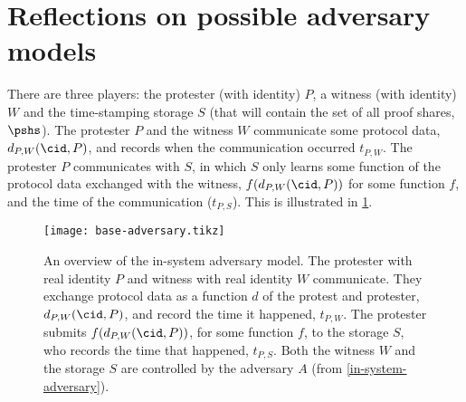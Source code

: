 \section{Reflections on possible adversary models}%
\label{reflections-adversary-model}


There are three players: the protester (with identity) \(P\), a witness (with 
identity) \(W\) and the time-stamping storage \(S\) (that will contain the set 
of all proof shares, \(\pshs\)).
The protester \(P\) and the witness \(W\) communicate some protocol data,
\(d_{P,W}(\cid, P)\), and records when the communication occurred \(t_{P,W}\).
The protester \(P\) communicates with \(S\), in which \(S\) only learns some 
function of the protocol data exchanged with the witness, \(f(d_{P,W}(\cid, 
  P))\) for some function \(f\), and the time of the communication 
(\(t_{P,S}\)).
This is illustrated in \cref{fig:base-adversary}.

\begin{figure}
  \centering
  \texttt{[image: base-adversary.tikz]}
  \caption{\label{fig:base-adversary}%
    An overview of the in-system adversary model.
    The protester with real identity \(P\) and witness with real identity \(W\) 
    communicate.
    They exchange protocol data as a function \(d\) of the protest and protester, \(d_{P,W}(\cid, P)\), and record the time it 
    happened, \(t_{P,W}\).
    The protester submits \(f(d_{P,W}(\cid, P))\), for some function \(f\), to 
    the storage \(S\), who records the time that happened, \(t_{P,S}\).
    Both the witness \(W\) and the storage \(S\) are controlled by the adversary 
    \(A\) (from \cref{in-system-adversary}).
  }
\end{figure}


